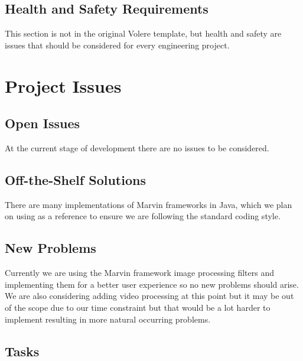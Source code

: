 \documentclass[12pt, titlepage]{article}
\begin{document}
\subsection{Health and Safety Requirements}

This section is not in the original Volere template, but health and safety are
issues that should be considered for every engineering project.

\section{Project Issues}

\subsection{Open Issues}
At the current stage of development there are no issues to be considered.

\subsection{Off-the-Shelf Solutions}

There are many implementations of Marvin frameworks in Java, which we plan on using as a reference to ensure we are following the standard coding style.

\subsection{New Problems}

Currently we are using the Marvin framework image processing filters and implementing them for a better user experience so no new problems should arise. We are also considering adding video processing at this point but it may be out of the scope due to our time constraint but that would be a lot harder to implement resulting in more natural occurring problems.

\subsection{Tasks}
\end{document}

